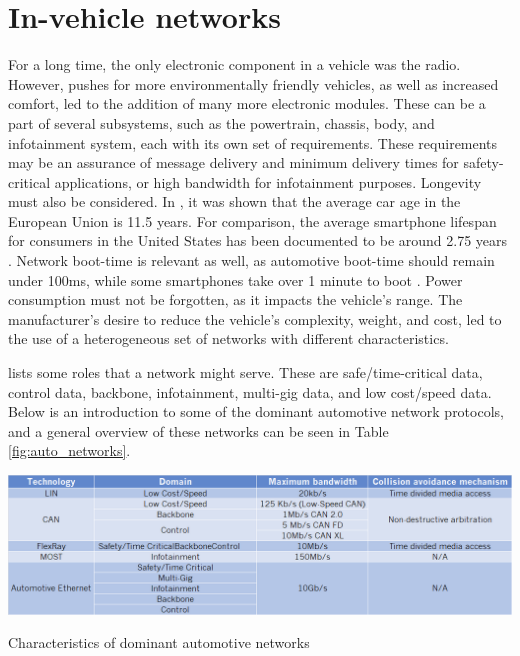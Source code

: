 \section{In-vehicle networks}

For a long time, the only electronic component in a vehicle was the radio. However, pushes for more environmentally friendly vehicles, as well as increased comfort, led to the addition of many more electronic modules. These can be a part of several subsystems, such as the powertrain, chassis, body, and infotainment system, each with its own set of requirements. These requirements may be an assurance of message delivery and minimum delivery times for safety-critical applications, or high bandwidth for infotainment purposes. Longevity must also be considered. In \cite{AvgCarAge}, it was shown that the average car age in the European Union is 11.5 years. For comparison, the average smartphone lifespan for consumers in the United States has been documented to be around 2.75 years \citep{AvgPhoneAge}. Network boot-time is relevant as well, as automotive boot-time should remain under 100ms, while some smartphones take over 1 minute to boot \citep{AutomotiveNetworks}. Power consumption must not be forgotten, as it impacts the vehicle's range. The manufacturer's desire to reduce the vehicle's complexity, weight, and cost, led to the use of a heterogeneous set of networks with different characteristics.\par

\cite{AutomotiveNetworks} lists some roles that a network might serve. These are safe/time-critical data, control data, backbone, infotainment, multi-gig data, and low cost/speed data. Below is an introduction to some of the dominant automotive network protocols, and a general overview of these networks can be seen in Table \ref{fig:auto_networks}.

\begin{table}
    \centering
    \includegraphics[width = \textwidth]{img/parts/introduction/Network Table.png}
    \caption{Characteristics of dominant automotive networks}
    \label{fig:auto_networks}
\end{table}

